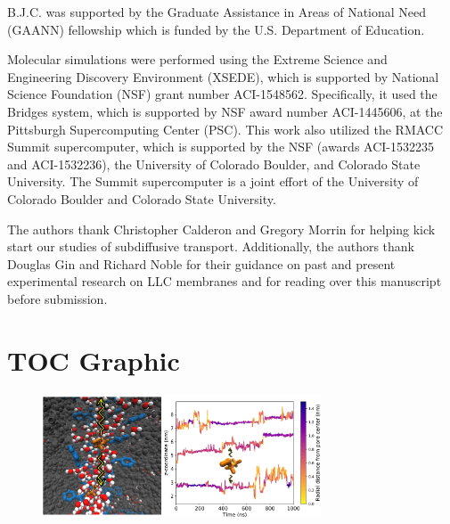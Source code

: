 \documentclass[journal=jpcbfk,manuscript=article]{achemso}
\begin{document}
  B.J.C. was supported by the Graduate Assistance in Areas of National Need (GAANN) 
  fellowship which is funded by the U.S. Department of Education. 

  Molecular simulations were performed using the Extreme Science and
  Engineering Discovery Environment (XSEDE), which is supported by National
  Science Foundation (NSF) grant number ACI-1548562. Specifically, it used the Bridges
  system, which is supported by NSF award number ACI-1445606, at the Pittsburgh
  Supercomputing Center (PSC). This work also utilized the RMACC Summit supercomputer,
  which is supported by the NSF (awards ACI-1532235 and
  ACI-1532236), the University of Colorado Boulder, and Colorado State
  University. The Summit supercomputer is a joint effort of the University of
  Colorado Boulder and Colorado State University.
  
  The authors thank Christopher Calderon and Gregory Morrin for helping kick start
  our studies of subdiffusive transport. Additionally, the authors thank 
  Douglas Gin and Richard Noble for their guidance on past and present experimental
  research on LLC membranes and for reading over this manuscript before submission.

  \clearpage

  
  

  \newpage

  \section*{TOC Graphic}
  
  \begin{figure}[!htb]
  \centering
  \includegraphics[width=3.25in]{toc_transport.pdf}
  \end{figure}
\end{document}
